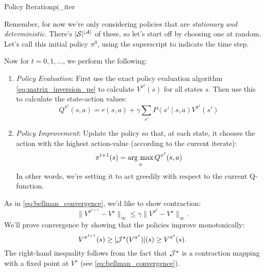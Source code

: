 \documentclass[../main/main]{subfiles}
\begin{document}
\begin{theorem}{Policy Iteration}{pi_iter}

Remember, for now we're only considering policies that are \emph{stationary and deterministic}. There's $|\mathcal{S}|^{|\mathcal{A}|}$ of these, so let's start off by choosing one at random. Let's call this initial policy $\pi^0$, using the superscript to indicate the time step.

Now for $t = 0, 1, \dots$, we perform the following:

\begin{enumerate}
\item \emph{Policy Evaluation}: First use the exact policy evaluation algorithm \ref{eq:matrix_inversion_pe} to calculate $V^{\pi^t}(s)$ for all states $s$. Then use this to calculate the state-action values:
    \[
        Q^{\pi^t}(s, a) = r(s, a) + \gamma \sum_{s'} P(s' \mid s, a) V^{\pi^t} (s')
    \]

\item \emph{Policy Improvement}: Update the policy so that, at each state,
    it chooses the action with the highest action-value (according to the current iterate):
    \[
        \pi^{t+1}(s) = \operatorname*{\textrm{arg\ max}}_a Q^{\pi^t} (s, a)
    \]
    In other words, we're setting it to act greedily with respect to the current Q-function.
\end{enumerate}


As in \ref{eq:bellman_convergence}, we'd like to show contraction:
\[
    \|V^{\pi^{t+1}} - V^\star \|_{\infty} \le \gamma \|V^{\pi^{t}} - V^\star \|_{\infty}.
\]
We'll prove convergence by showing that the policies improve monotonically:
\[
    V^{\pi^{t+1}}(s) \ge [\mathcal{J}^{\star}(V^{\pi^{t}})](s) \ge V^{\pi^{t}}(s).
\]
The right-hand inequality follows from the fact that $\mathcal{J}^{\star}$ is a contraction mapping with a fixed point at $V^{\star}$ (see \ref{eq:bellman_convergence}).


\end{theorem}
\end{document}
